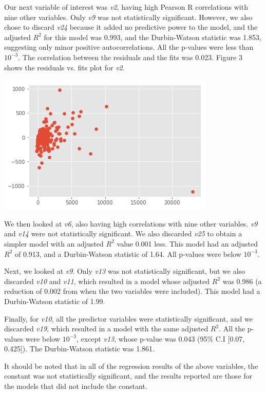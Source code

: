 \documentclass[12pt,a4paper,twocolumn]{article}
\begin{document}
	Our next variable of interest was \textit{v2}, having high Pearson R correlations with nine other variables. Only \textit{v9} was not statistically significant. However, we also chose to discard \textit{v24} because it added no predictive power to the model, and the adjusted $R^2$ for this model was 0.993, and the Durbin-Watson statistic was 1.853, suggesting only minor positive autocorrelations. All the p-values were less than $10^{-3}$. The correlation between the residuals and the fits was 0.023. Figure 3 shows the residuals vs. fits plot for \textit{v2}.
	
	\includegraphics[scale=0.5]{fig3.png}
	\begingroup
	\endgroup
	\hfill\break
	
	We then looked at \textit{v6}, also having high correlations with nine other variables. \textit{v9} and \textit{v14} were not statistically significant. We also discarded \textit{v25} to obtain a simpler model with an adjusted $R^2$ value 0.001 less. This model had an adjusted $R^2$ of 0.913, and a Durbin-Watson statistic of 1.64. All p-values were below $10^{-3}$.
	
	Next, we looked at \textit{v9}. Only \textit{v13} was not statistically significant, but we also discarded \textit{v10} and \textit{v11}, which resulted in a model whose adjusted $R^2$ was 0.986 (a reduction of 0.002 from when the two variables were included). This model had a Durbin-Watson statistic of 1.99.
	
	Finally, for \textit{v10}, all the predictor variables were statistically significant, and we discarded \textit{v19}, which resulted in a model with the same adjusted $R^2$. All the p-values were below $10^{-3}$, except \textit{v13}, whose p-value was 0.043 (95\% C.I [0.07, 0.425]). The Durbin-Watson statistic was 1.861.
	
	It should be noted that in all of the regression results of the above variables, the constant was not statistically significant, and the results reported are those for the models that did not include the constant.
	
\end{document}
